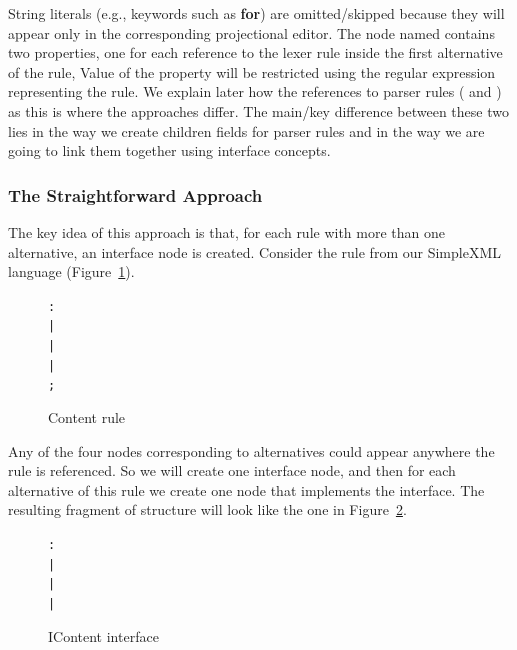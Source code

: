 String literals (e.g., keywords such as \textbf{for}) are omitted/skipped because they will appear only in the corresponding projectional editor.
The node named  contains two properties, one for each reference to the lexer rule  inside the first alternative of the  rule,
Value of the property will be restricted using the regular expression representing the  rule.
We explain later how the references to parser rules ( and ) as this is where the approaches differ.
The main/key difference between these two lies in the way we create children fields for parser rules and in the way we are going to link them together using interface concepts.

\subsubsection{The Straightforward Approach}
\label{sect:straightforward_approach}

The key idea of this approach is that, for each rule with more than one alternative, an interface node is created.
Consider the  rule from our SimpleXML language (Figure~\ref{fig:contentrule}).

\begin{figure}[ht]
\centering
\begin{framed}
\begin{alltt}
	    :   
           |   
           |   
           |   
           ;
\end{alltt}
\end{framed}
\caption{Content rule}
\label{fig:contentrule}
\end{figure}

Any of the four nodes corresponding to alternatives could appear anywhere the  rule is referenced.
So we will create one interface node, and then for each alternative of this rule we create one node that implements the interface.
The resulting fragment of structure will look like the one in Figure~\ref{fig:icontentitf}.

\begin{figure}[ht]
\centering
\begin{framed}
\begin{alltt}
	   :   
           |   
           |   
           |   
\end{alltt}
\end{framed}
\caption{IContent interface}
\label{fig:icontentitf}
\end{figure}

